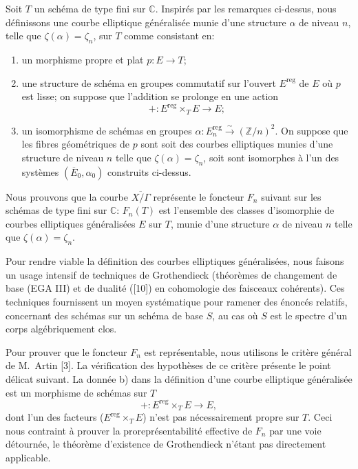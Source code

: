 \documentclass{amsart}
\theoremstyle{plain}
\theoremstyle{remark}
\newcommand{\bbC}{\mathbb{C}}
\newcommand{\bbZ}{\mathbb{Z}}
\begin{document}
Soit $T$ un sch\'ema de type fini sur $\bbC$. Inspir\'es par les remarques ci-dessus, nous d\'efinissons une courbe elliptique g\'en\'eralis\'ee munie d'une structure $\alpha$ de niveau $n$, telle que $\zeta(\alpha) = \zeta_n$, sur $T$ comme consistant en:

\begin{enumerate}
\item[a)] un morphisme propre et plat $p: E \to T$;
\item[b)] une structure de sch\'ema en groupes commutatif sur l'ouvert $E^{\mathrm{reg}}$ de $E$ o\`u $p$ est lisse; on suppose que l'addition se prolonge en une action
\[
+: E^{\mathrm{reg}} \times_T E \to E;
\]
\item[c)] un isomorphisme de sch\'emas en groupes $\alpha: E_n^{\mathrm{reg}} \xrightarrow{\sim} (\bbZ/n)^2$. On suppose que les fibres g\'eom\'etriques de $p$ sont soit des courbes elliptiques munies d'une structure de niveau $n$ telle que $\zeta(\alpha) = \zeta_n$, soit sont isomorphes \`a l'un des syst\`emes $(\overline{E}_0,\alpha_0)$ construits ci-dessus.
\end{enumerate}

Nous prouvons que la courbe $\overline{X/\Gamma}$ repr\'esente le foncteur $F_n$ suivant sur les sch\'emas de type fini sur $\bbC$: $F_n(T)$ est l'ensemble des classes d'isomorphie de courbes elliptiques g\'en\'eralis\'ees $E$ sur $T$, munie d'une structure $\alpha$ de niveau $n$ telle que $\zeta(\alpha) = \zeta_n$.

Pour rendre viable la d\'efinition des courbes elliptiques g\'en\'eralis\'ees, nous faisons un usage intensif de techniques de Grothendieck (th\'eor\`emes de changement de base (EGA III) et de dualit\'e ([10]) en cohomologie des faisceaux coh\'erents). Ces techniques fournissent un moyen syst\'ematique pour ramener des \'enonc\'es relatifs, concernant des sch\'emas sur un sch\'ema de base $S$, au cas o\`u $S$ est le spectre d'un corps alg\'ebriquement clos.

Pour prouver que le foncteur $F_n$ est repr\'esentable, nous utilisons le crit\`ere g\'en\'eral de M.~Artin [3]. La v\'erification des hypoth\`eses de ce crit\`ere pr\'esente le point d\'elicat suivant. La donn\'ee b) dans la d\'efinition d'une courbe elliptique g\'en\'eralis\'ee est un morphisme de sch\'emas sur $T$
\[
+: E^{\mathrm{reg}} \times_T E \to E,
\]
dont l'un des facteurs ($E^{\mathrm{reg}} \times_T E$) n'est pas n\'ecessairement propre sur $T$. Ceci nous contraint \`a prouver la prorepr\'esentabilit\'e effective de $F_n$ par une voie d\'etourn\'ee, le th\'eor\`eme d'existence de Grothendieck n'\'etant pas directement applicable.
\end{document}

